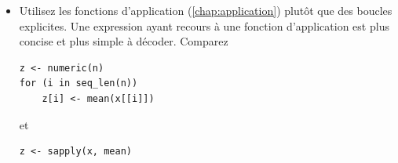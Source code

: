 \begin{itemize}
  d'un point de vue logique
  \begin{Schunk}
\begin{Verbatim}
if (!all(!is.na(x)))
\end{Verbatim}
  \end{Schunk}
  En revanche, s'il s'agit plutôt d'exécuter une expression quand un
  vecteur ne contient aucune donnée manquante, alors
  \begin{Schunk}
\begin{Verbatim}
if (all(!is.na(x)))
\end{Verbatim}
  \end{Schunk}
  est plus simple que
  \begin{Schunk}
\begin{Verbatim}
if (!any(is.na(x)))
\end{Verbatim}
  \end{Schunk}

  De plus, le conseil précédent sur la priorité des opérations est
  particulièrement indiqué avec les opérations logiques. Sauriez-vous
  confirmer, sans consulter le \autoref{tab:bases:operateurs}, l'ordre
  des opérations dans l'expression logique suivante?\footnote{%
    C'est .}
  \begin{Schunk}
\begin{Verbatim}
!p | q & r
\end{Verbatim}
  \end{Schunk}
\item Utilisez les fonctions d'application
  (\autoref{chap:application}) plutôt que des boucles explicites. Une
  expression ayant recours à une fonction d'application est plus
  concise et plus simple à décoder. Comparez
  \begin{Schunk}
\begin{Verbatim}
z <- numeric(n)
for (i in seq_len(n))
    z[i] <- mean(x[[i]])
\end{Verbatim}
  \end{Schunk}
  et
  \begin{Schunk}
\begin{Verbatim}
z <- sapply(x, mean)
\end{Verbatim}
  \end{Schunk}


\end{itemize}
